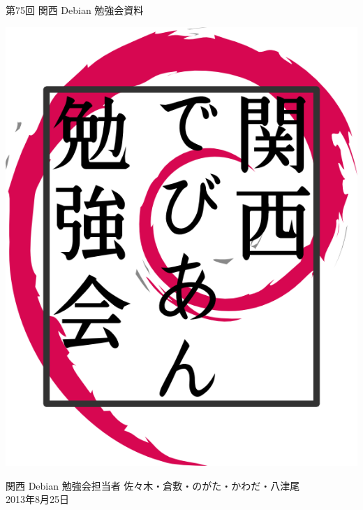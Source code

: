 \documentclass[mingoth,a4paper]{jsarticle}
\newcommand{\debmtgyear}{2013}
\newcommand{\debmtgdate}{25}
\newcommand{\debmtgmonth}{8}
\newcommand{\debmtgnumber}{75}
\begin{document}
\begin{titlepage}


 第\debmtgnumber{}回 関西 Debian 勉強会資料

\vspace{2cm}

\begin{center}
\includegraphics{image200802/kansaidebianlogo.png}
\end{center}

\begin{flushright}
\hfill{}関西 Debian 勉強会担当者 佐々木・倉敷・のがた・かわだ・八津尾 \\
\hfill{}\debmtgyear{}年\debmtgmonth{}月\debmtgdate{}日
\end{flushright}

\thispagestyle{empty}
\end{titlepage}


\vspace{1em}
\end{document}
